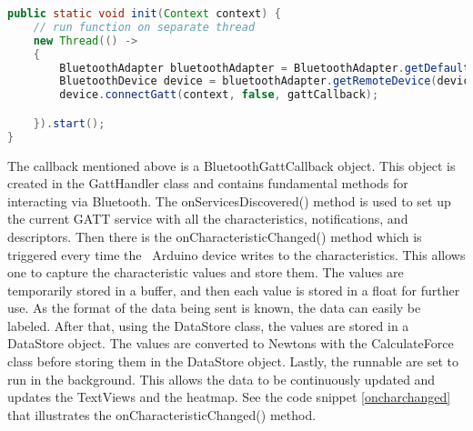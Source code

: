 \begin{lstlisting}[language=java,caption=init method in the GattHandler class, label=gattinit]
  public static void init(Context context) {
    // run function on separate thread
    new Thread(() ->
    {
        BluetoothAdapter bluetoothAdapter = BluetoothAdapter.getDefaultAdapter(); // use to perform fundamental Bluetooth tasks
        BluetoothDevice device = bluetoothAdapter.getRemoteDevice(deviceMAC); // specify our device MAC
        device.connectGatt(context, false, gattCallback);

    }).start();
}
\end{lstlisting}
The callback mentioned above is a BluetoothGattCallback object. This object is created in the GattHandler class and contains fundamental methods for interacting via Bluetooth. The onServicesDiscovered() method is used to set up the current GATT service with all the characteristics, notifications, and descriptors. Then there is the onCharacteristicChanged() method which is triggered every time the \ Arduino device writes to the characteristics. This allows one to capture the characteristic values and store them. The values are temporarily stored in a buffer, and then each value is stored in a float for further use. As the format of the data being sent is known, the data can easily be labeled. After that, using the DataStore class, the values are stored in a DataStore object. The values are converted to Newtons with the CalculateForce class before storing them in the DataStore object. Lastly, the runnable are set to run in the background. This allows the data to be continuously updated and updates the TextViews and the heatmap. See the code snippet \ref{oncharchanged} that illustrates the  onCharacteristicChanged() method.
\clearpage
